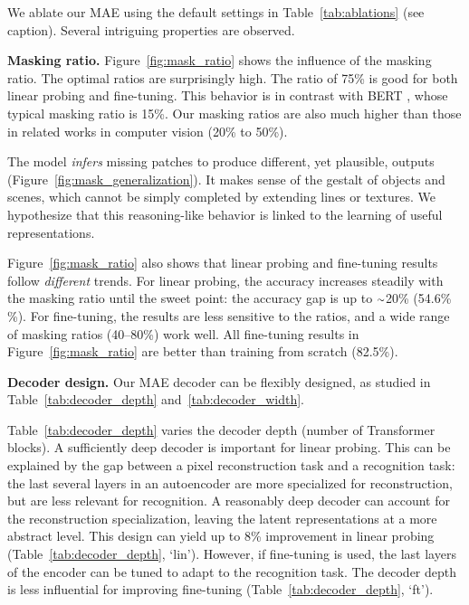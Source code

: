 \documentclass[10pt,twocolumn,letterpaper]{article}
\renewcommand{\paragraph}[1]{\vspace{1.25mm}\noindent\textbf{#1}}
\newcommand{\app}{\raise.17ex\hbox{$\scriptstyle\sim$}}
\begin{document}
We ablate our MAE using the default settings in Table~\ref{tab:ablations} (see caption). Several intriguing properties are observed.

\paragraph{Masking ratio.} Figure~\ref{fig:mask_ratio} shows the influence of the masking ratio. The optimal ratios are surprisingly high. The ratio of 75\% is good for both linear probing and fine-tuning. This behavior is in contrast with BERT \cite{Devlin2019}, whose typical masking ratio is 15\%. Our masking ratios are also much higher than those in related works \cite{Chen2020c,Dosovitskiy2021,Bao2021} in computer vision (20\% to 50\%).

The model \textit{infers} missing patches to produce different, yet plausible, outputs (Figure~\ref{fig:mask_generalization}). It makes sense of the gestalt of objects and scenes, which cannot be simply completed by extending lines or textures. We hypothesize that this reasoning-like behavior is linked to the learning of useful representations.

Figure~\ref{fig:mask_ratio} also shows that linear probing and fine-tuning results follow \textit{different} trends. For linear probing, the accuracy increases steadily with the masking ratio until the sweet point: the accuracy gap is up to $\app$20\% (54.6\% \%). For fine-tuning, the results are less sensitive to the ratios, and a wide range of masking ratios (40--80\%) work well. All fine-tuning results in Figure~\ref{fig:mask_ratio} are better than training from scratch (82.5\%).

\paragraph{Decoder design.} Our MAE decoder can be flexibly designed, as studied in Table~\ref{tab:decoder_depth} and~\ref{tab:decoder_width}.

Table~\ref{tab:decoder_depth} varies the decoder depth (number of Transformer blocks). A sufficiently deep decoder is important for linear probing. This can be explained by the gap between a pixel reconstruction task and a recognition task: the last several layers in an autoencoder are more specialized for reconstruction, but are less relevant for recognition. A reasonably deep decoder can account for the reconstruction specialization, leaving the latent representations at a more abstract level. This design can yield up to 8\% improvement in linear probing (Table~\ref{tab:decoder_depth}, `lin'). However, if fine-tuning is used, the last layers of the encoder can be tuned to adapt to the recognition task. The decoder depth is less influential for improving fine-tuning (Table~\ref{tab:decoder_depth}, `ft').
\end{document}
